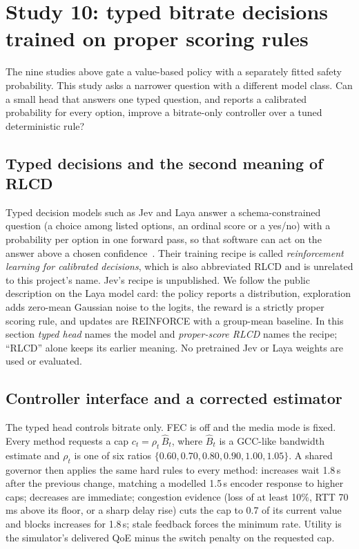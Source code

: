 \documentclass[10pt]{article}
\begin{document}
\section{Study 10: typed bitrate decisions trained on proper scoring rules}
\label{sec:typed}
The nine studies above gate a value-based policy with a separately fitted safety probability. This study asks a narrower question with a different model class. Can a small head that answers one typed question, and reports a calibrated probability for every option, improve a bitrate-only controller over a tuned deterministic rule?

\subsection{Typed decisions and the second meaning of RLCD}
Typed decision models such as Jev and Laya answer a schema-constrained question (a choice among listed options, an ordinal score or a yes/no) with a probability per option in one forward pass, so that software can act on the answer above a chosen confidence~\cite{laya2026modelcard}\cite{barbosa2026jev}. Their training recipe is called \emph{reinforcement learning for calibrated decisions}, which is also abbreviated RLCD and is unrelated to this project's name. Jev's recipe is unpublished. We follow the public description on the Laya model card: the policy reports a distribution, exploration adds zero-mean Gaussian noise to the logits, the reward is a strictly proper scoring rule, and updates are REINFORCE with a group-mean baseline. In this section \emph{typed head} names the model and \emph{proper-score RLCD} names the recipe; ``RLCD'' alone keeps its earlier meaning. No pretrained Jev or Laya weights are used or evaluated.

\subsection{Controller interface and a corrected estimator}
The typed head controls bitrate only. FEC is off and the media mode is fixed. Every method requests a cap $c_t=\rho_t\,\hat B_t$, where $\hat B_t$ is a GCC-like bandwidth estimate and $\rho_t$ is one of six ratios $\{0.60,0.70,0.80,0.90,1.00,1.05\}$. A shared governor then applies the same hard rules to every method: increases wait 1.8\,s after the previous change, matching a modelled 1.5\,s encoder response to higher caps; decreases are immediate; congestion evidence (loss of at least 10\%, RTT 70\,ms above its floor, or a sharp delay rise) cuts the cap to 0.7 of its current value and blocks increases for 1.8\,s; stale feedback forces the minimum rate. Utility is the simulator's delivered QoE minus the switch penalty on the requested cap.
\end{document}
